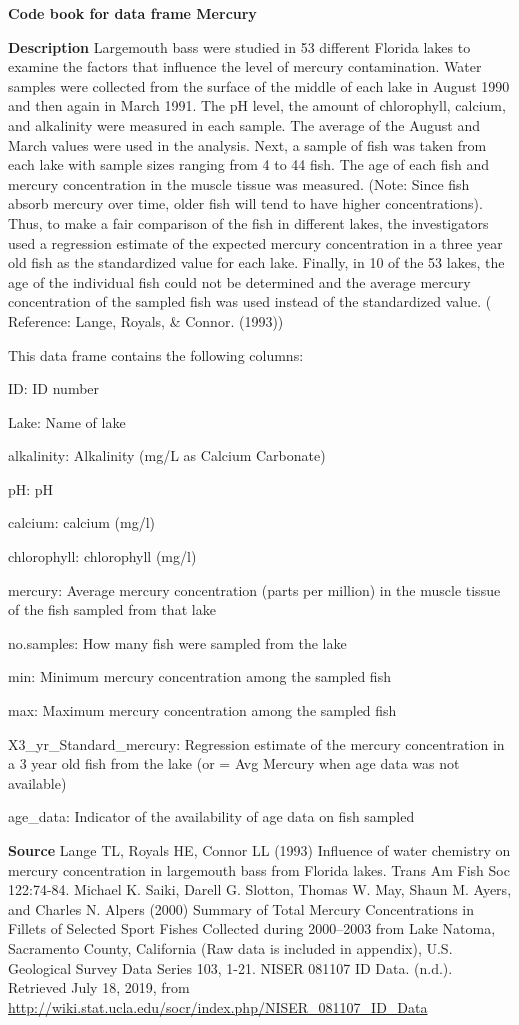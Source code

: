 \documentclass[
]{book}
\begin{document}
\textbf{Code book for data frame Mercury}

\textbf{Description}
Largemouth bass were studied in 53 different Florida lakes to examine the factors that influence the level of mercury contamination. Water samples were collected from the surface of the middle of each lake in August 1990 and then again in March 1991. The pH level, the amount of chlorophyll, calcium, and alkalinity were measured in each sample. The average of the August and March values were used in the analysis. Next, a sample of fish was taken from each lake with sample sizes ranging from 4 to 44 fish. The age of each fish and mercury concentration in the muscle tissue was measured. (Note: Since fish absorb mercury over time, older fish will tend to have higher concentrations). Thus, to make a fair comparison of the fish in different lakes, the investigators used a regression estimate of the expected mercury concentration in a three year old fish as the standardized value for each lake. Finally, in 10 of the 53 lakes, the age of the individual fish could not be determined and the average mercury concentration of the sampled fish was used instead of the standardized value. ( Reference: Lange, Royals, \& Connor. (1993))

This data frame contains the following columns:

ID: ID number

Lake: Name of lake

alkalinity: Alkalinity (mg/L as Calcium Carbonate)

pH: pH

calcium: calcium (mg/l)

chlorophyll: chlorophyll (mg/l)

mercury: Average mercury concentration (parts per million) in the muscle tissue of the fish sampled from that lake

no.samples: How many fish were sampled from the lake

min: Minimum mercury concentration among the sampled fish

max: Maximum mercury concentration among the sampled fish

X3\_yr\_Standard\_mercury: Regression estimate of the mercury concentration in a 3 year old fish from the lake (or = Avg Mercury when age data was not available)

age\_data: Indicator of the availability of age data on fish sampled

\textbf{Source}
Lange TL, Royals HE, Connor LL (1993) Influence of water chemistry on mercury concentration in largemouth bass from Florida lakes. Trans Am Fish Soc 122:74-84.
Michael K. Saiki, Darell G. Slotton, Thomas W. May, Shaun M. Ayers, and Charles N. Alpers (2000) Summary of Total Mercury Concentrations in Fillets of Selected Sport Fishes Collected during 2000--2003 from Lake Natoma, Sacramento County, California (Raw data is included in appendix), U.S. Geological Survey Data Series 103, 1-21.
NISER 081107 ID Data. (n.d.). Retrieved July 18, 2019, from \url{http://wiki.stat.ucla.edu/socr/index.php/NISER_081107_ID_Data}
\end{document}
